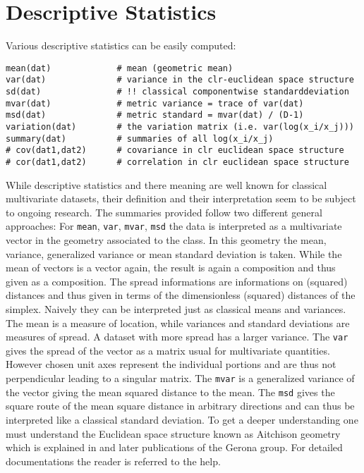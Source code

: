 \documentclass{article}
\newcommand{\code}[1]{{\tt #1}}
\begin{document}
\section{Descriptive Statistics}
Various descriptive statistics can be easily computed:
\begin{verbatim}
mean(dat)             # mean (geometric mean)
var(dat)              # variance in the clr-euclidean space structure
sd(dat)               # !! classical componentwise standarddeviation
mvar(dat)             # metric variance = trace of var(dat)
msd(dat)              # metric standard = mvar(dat) / (D-1)
variation(dat)        # the variation matrix (i.e. var(log(x_i/x_j)))
summary(dat)          # summaries of all log(x_i/x_j)
# cov(dat1,dat2)      # covariance in clr euclidean space structure
# cor(dat1,dat2)      # correlation in clr euclidean space structure
\end{verbatim}
While descriptive statistics and there meaning are well known for classical
multivariate datasets, their definition and their interpretation seem to be
subject to ongoing research. The summaries provided follow two different
general approaches: For \code{mean}, \code{var}, \code{mvar}, \code{msd} the
data is interpreted as a multivariate vector in the geometry associated to
the class. In this geometry the mean, variance, generalized variance or mean
standard deviation is taken. While the mean of vectors is a vector again, the
result is again a composition and thus given as a composition. The spread
informations are informations on (squared) distances and thus given in terms
of the dimensionless (squared) distances of the simplex. Naively they can be
interpreted just as classical means and variances. The mean is a measure of
location, while variances and standard deviations are measures of spread. A
dataset with more spread has a larger variance. The \code{var} gives the
spread of the vector as a matrix usual for multivariate quantities. However
chosen unit axes represent the individual portions and are thus not
perpendicular leading to a singular matrix. The \code{mvar} is a generalized
variance of the vector giving the mean squared distance to the mean. The
\code{msd} gives the square route of the mean square distance in arbitrary
directions and can thus be interpreted like a classical standard deviation. To
get a deeper understanding one must understand the Euclidean space structure
known as Aitchison geometry which is explained in \cite{BM+01} and later
publications of the Gerona group. For detailed documentations the reader is
referred to the help.
\end{document}
